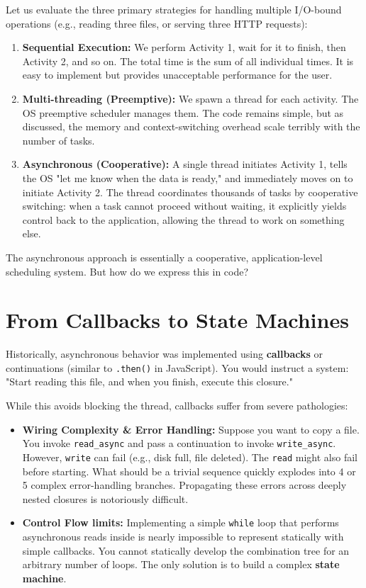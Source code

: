 Let us evaluate the three primary strategies for handling multiple I/O-bound operations (e.g., reading three files, or serving three HTTP requests):

\begin{enumerate}
    \item \textbf{Sequential Execution:} We perform Activity 1, wait for it to finish, then Activity 2, and so on. The total time is the sum of all individual times. It is easy to implement but provides unacceptable performance for the user.
    \item \textbf{Multi-threading (Preemptive):} We spawn a thread for each activity. The OS preemptive scheduler manages them. The code remains simple, but as discussed, the memory and context-switching overhead scale terribly with the number of tasks.
    \item \textbf{Asynchronous (Cooperative):} A single thread initiates Activity 1, tells the OS "let me know when the data is ready," and immediately moves on to initiate Activity 2. The thread coordinates thousands of tasks by cooperative switching: when a task cannot proceed without waiting, it explicitly yields control back to the application, allowing the thread to work on something else.
\end{enumerate}

The asynchronous approach is essentially a cooperative, application-level scheduling system. But how do we express this in code?

\section{From Callbacks to State Machines}

Historically, asynchronous behavior was implemented using \textbf{callbacks} or continuations (similar to \texttt{.then()} in JavaScript). You would instruct a system: "Start reading this file, and when you finish, execute this closure." 

While this avoids blocking the thread, callbacks suffer from severe pathologies:
\begin{itemize}
    \item \textbf{Wiring Complexity \& Error Handling:} Suppose you want to copy a file. You invoke \texttt{read\_async} and pass a continuation to invoke \texttt{write\_async}. However, \texttt{write} can fail (e.g., disk full, file deleted). The \texttt{read} might also fail before starting. What should be a trivial sequence quickly explodes into 4 or 5 complex error-handling branches. Propagating these errors across deeply nested closures is notoriously difficult.
    \item \textbf{Control Flow limits:} Implementing a simple \texttt{while} loop that performs asynchronous reads inside is nearly impossible to represent statically with simple callbacks. You cannot statically develop the combination tree for an arbitrary number of loops. The only solution is to build a complex \textbf{state machine}.
\end{itemize}

